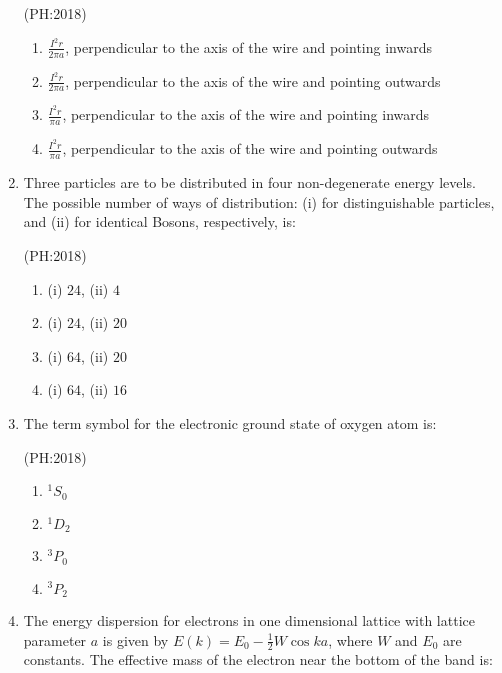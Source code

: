 \documentclass[journal,12pt,onecolumn]{IEEEtran}
\theoremstyle{remark}
\begin{document}
\begin{enumerate}
    \hfill{(PH:2018)}
    \begin{enumerate}
        \item $\frac{I^2 r}{2\pi a}$, perpendicular to the axis of the wire and pointing inwards
        \item $\frac{I^2 r}{2\pi a}$, perpendicular to the axis of the wire and pointing outwards
        \item $\frac{I^2 r}{\pi a}$, perpendicular to the axis of the wire and pointing inwards
        \item $\frac{I^2 r}{\pi a}$, perpendicular to the axis of the wire and pointing outwards
    \end{enumerate}
   

    \item Three particles are to be distributed in four non-degenerate energy levels. The possible number of ways of distribution: (i) for distinguishable particles, and (ii) for identical Bosons, respectively, is:

    \hfill{(PH:2018)}
    \begin{multicols}{4}
    \begin{enumerate}
        \item (i) $24$, (ii) $4$
        \item (i) $24$, (ii) $20$
        \item (i) $64$, (ii) $20$
        \item (i) $64$, (ii) $16$
    \end{enumerate}
	    \end{multicols}
  

    \item The term symbol for the electronic ground state of oxygen atom is:

    \hfill{(PH:2018)}
    \begin{multicols}{4}
    \begin{enumerate}
        \item $^1S_0$
        \item $^1D_{2}$
        \item $^3P_0$
        \item $^3P_{2}$
    \end{enumerate}
	    \end{multicols}
    

    \item The energy dispersion for electrons in one dimensional lattice with lattice parameter $a$ is given by $E(k) = E_0 - \frac{1}{2}W \cos ka$, where $W$ and $E_0$ are constants. The effective mass of the electron near the bottom of the band is:


\end{enumerate}
\end{document}
